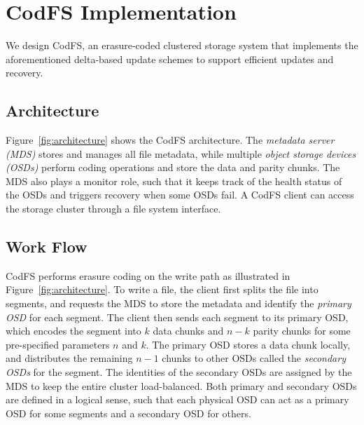 \section{CodFS Implementation}
\label{sec:design}

We design CodFS, an erasure-coded clustered storage system that implements 
the aforementioned delta-based update schemes to support efficient updates 
and recovery.  

\subsection{Architecture} 

Figure~\ref{fig:architecture} shows the CodFS architecture.  The
{\em metadata server (MDS)} stores and manages all file metadata, while
multiple {\em object storage devices (OSDs)} perform coding operations and
store the data and parity chunks.  The MDS also plays a monitor role, such
that it keeps track of the health status of the OSDs and triggers recovery
when some OSDs fail.  A CodFS client can access the storage cluster through a
file system interface. 

\subsection{Work Flow}
\label{sec:workflow}
CodFS performs erasure coding on the write path as illustrated in
Figure~\ref{fig:architecture}.  To write a file, the client first splits the
file into segments, and requests the MDS to store the metadata and identify
the {\em primary OSD} for each segment.  The client then sends each segment to
its primary OSD, which encodes the segment into $k$ data chunks and $n-k$
parity chunks for some pre-specified parameters $n$ and $k$.  The primary OSD
stores a data chunk locally, and distributes the remaining $n-1$ chunks to
other OSDs called the {\em secondary OSDs} for the segment.  The identities of
the secondary OSDs are assigned by the MDS to keep the entire cluster
load-balanced.  Both primary and secondary OSDs are defined in a logical
sense, such that each physical OSD can act as a primary OSD for some segments
and a secondary OSD for others. 

\setlength{}
\setlength{}

